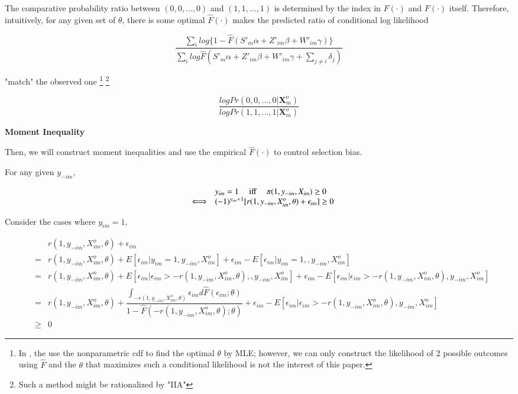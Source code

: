 \documentclass[a4paper]{article}
\begin{document}
The comparative probability ratio between $(0,0,...,0)$ and $(1, 1, ..., 1)$ is determined by the index in $F(\cdot)$ and $F(\cdot)$ itself. Therefore, intuitively, for any given set of $\theta$, there is some optimal $\hat{F}(\cdot)$ makes the predicted ratio of conditional log likelihood 

$$\dfrac{\sum_i log \{1 - \hat{F}(S'_m\alpha+Z'_{im}\beta+W'_{im}\gamma)\}}{\sum_i log \hat{F}(S'_m\alpha+Z'_{im}\beta+W'_{im}\gamma + \sum_{j\neq i}\delta_{j})}$$

"match" the observed one \footnote{In \cite{cosslett1983distribution}, the use the nonparametric cdf to find the optimal $\theta$ by MLE; however, we can only construct the likelihood of 2 possible outcomes using $\hat{F}$ and the $\theta$ that maximizes such a conditional likelihood is not the interest of this paper.}
\footnote{Such a method might be rationalized by "IIA"}

$$\dfrac{log Pr(0,0,...,0|\textbf{X}^o_m) }{log Pr(1,1,...,1|\textbf{X}^o_m)}$$




\bigskip

\textbf{Moment Inequality}

\bigskip

Then, we will construct moment inequalities and use the empirical $\hat{F}(\cdot)$ to control selection bias.

\bigskip

For any given $y_{-im}$,

$$
\begin{array}{rcl}
&&y_{im}=1 \mbox{ \quad iff \quad }  \pi(1,y_{-im},X_{im}) \geq 0 \\
&\Longleftrightarrow&  (-1)^{y_{im}+1}[r(1,y_{-im},X^o_{im},\theta)+ \epsilon_{im}]\geq 0 \\
\end{array}
$$

Consider the cases where $y_{im}=1$,

$$
\begin{array}{rcl}
&& r(1,y_{-im},X^o_{im},\theta)+ \epsilon_{im} \\
&=& r(1,y_{-im},X^o_{im},\theta)+ E[\epsilon_{im}|y_{im} = 1, y_{-im}, X^o_{im}] + \epsilon_{im} - E[\epsilon_{im}|y_{im} = 1, , y_{-im}, X^o_{im}]\\&=& r(1,y_{-im},X^o_{im},\theta) + E[\epsilon_{im}|\epsilon_{im} > -r(1,y_{-im},X^o_{im},\theta), , y_{-im}, X^o_{im}] + \epsilon_{im} - E[\epsilon_{im}|\epsilon_{im} > -r(1,y_{-im},X^o_{im},\theta), y_{-im}, X^o_{im}] \\
&=& r(1,y_{-im},X^o_{im},\theta) + \dfrac{\int_{-r(1,y_{-im},X^o_{im},\theta)} \epsilon_{im}d\hat{F}(\epsilon_{im}; \theta)}{1 - \hat{F}(-r(1,y_{-im},X^o_{im},\theta); \theta)} + \epsilon_{im} - E[\epsilon_{im}|\epsilon_{im} > -r(1,y_{-im},X^o_{im},\theta), y_{-im}, X^o_{im}] \\
&\geq& 0
\end{array}
$$
\end{document}
